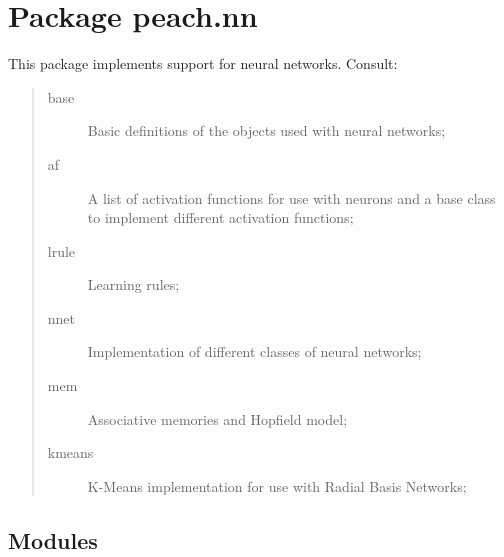 %
%
%


\section{Package peach.nn}

    \label{peach:nn}

This package implements support for neural networks. Consult:
%
\begin{quote}
%
\begin{description}
\item[{base}] \leavevmode 
Basic definitions of the objects used with neural networks;

\item[{af}] \leavevmode 
A list of activation functions for use with neurons and a base class to
implement different activation functions;

\item[{lrule}] \leavevmode 
Learning rules;

\item[{nnet}] \leavevmode 
Implementation of different classes of neural networks;

\item[{mem}] \leavevmode 
Associative memories and Hopfield model;

\item[{kmeans}] \leavevmode 
K-Means implementation for use with Radial Basis Networks;

\end{description}

\end{quote}


\subsection{Modules}

